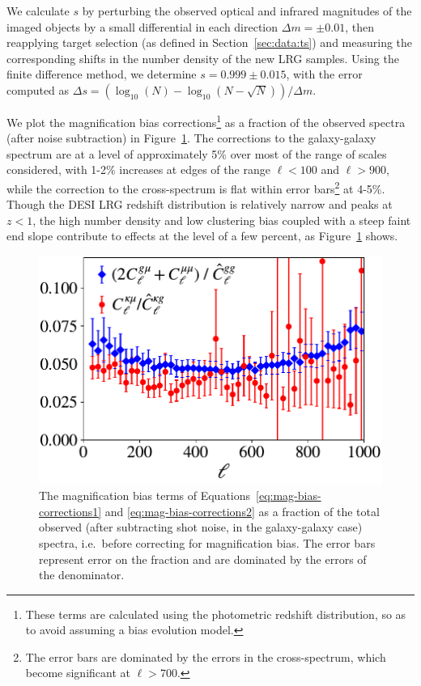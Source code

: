 \documentclass[a4paper,usenatbib]{mnras}
\begin{document}
We calculate $s$ by perturbing the observed optical and infrared magnitudes of the imaged objects by a small differential in each direction $\Delta m = \pm 0.01$, then reapplying target selection (as defined in Section~\ref{sec:data:ts}) and measuring the corresponding shifts in the number density of the new LRG samples. Using the finite difference method, we determine $s = 0.999 \pm 0.015$, with the error computed as $\Delta s = (\log_{10}(N) - \log_{10}(N - \sqrt{N}))/\Delta m$. 

We plot the magnification bias corrections\footnote{These terms are calculated using the photometric redshift distribution, so as to avoid assuming a bias evolution model.} as a fraction of the observed spectra (after noise subtraction) in Figure~\ref{fig:mag_bias_frac}. 
The corrections to the galaxy-galaxy spectrum are at a level of approximately 5\% over most of the range of scales considered, with 1-2\% increases at edges of the range $\ell < 100$ and $\ell > 900$, while the correction to the cross-spectrum is flat within error bars\footnote{The error bars are dominated by the errors in the cross-spectrum, which become significant at $\ell > 700$.} at 4-5\%. Though the DESI LRG redshift distribution is relatively narrow and peaks at $z < 1$, the high number density and low clustering bias coupled with a steep faint end slope contribute to effects at the level of a few percent, as Figure~\ref{fig:mag_bias_frac} shows.

\begin{figure}
\includegraphics[width=\linewidth,trim={0 0 0 0}]{figures/mag_bias_frac.pdf}
\caption{The magnification bias terms of Equations~\ref{eq:mag-bias-corrections1} and \ref{eq:mag-bias-corrections2} as a fraction of the total observed (after subtracting shot noise, in the galaxy-galaxy case) spectra, i.e.\ before correcting for magnification bias. The error bars represent error on the fraction and are dominated by the errors of the denominator.}
\label{fig:mag_bias_frac}
\end{figure}
\end{document}
